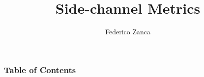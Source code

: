 \documentclass{beamer}
\title[Power Analysis Side-channel Attacks] %
{Side-channel Metrics}
\subtitle{}
\author[Federico Zanca] %
{Federico Zanca}
\institute[] %
{
  Computer Science and Engineering\\
  Politecnico di Milano
}
\date[2025] %
{}
\begin{document}
\frame{\titlepage}


\begin{frame}
\frametitle{Table of Contents}
\tableofcontents
\end{frame}









\end{document}
